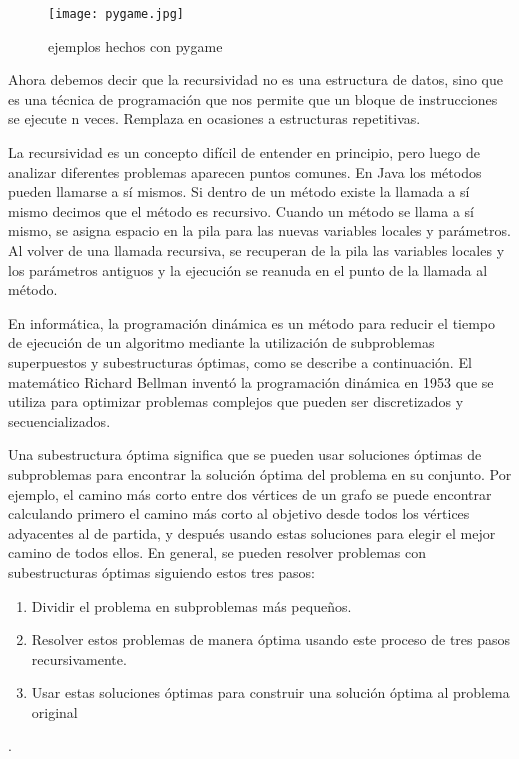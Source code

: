 \documentclass[10pt,twocolumn]{article}
\begin{document}
\begin{figure}[ht]
  \centering
  \texttt{[image: pygame.jpg]}
  \caption{ejemplos hechos con pygame}
\end{figure}

Ahora debemos decir que la recursividad no es una estructura de datos, sino que es una técnica de programación que nos permite que un bloque de instrucciones se ejecute n veces. Remplaza en ocasiones a estructuras repetitivas.

La recursividad es un concepto difícil de entender en principio, pero luego de analizar diferentes problemas aparecen puntos comunes.
En Java los métodos pueden llamarse a sí mismos. Si dentro de un método existe la llamada a sí mismo decimos que el método es recursivo.
Cuando un método se llama a sí mismo, se asigna espacio en la pila para las nuevas variables locales y parámetros.
Al volver de una llamada recursiva, se recuperan de la pila las variables locales y los parámetros antiguos y la ejecución se reanuda en el punto de la llamada al método.

En informática, la programación dinámica es un método para reducir el tiempo de ejecución de un algoritmo mediante la utilización de subproblemas superpuestos y subestructuras óptimas, como se describe a continuación. El matemático Richard Bellman inventó la programación dinámica en 1953 que se utiliza para optimizar problemas complejos que pueden ser discretizados y secuencializados.

Una subestructura óptima significa que se pueden usar soluciones óptimas de subproblemas para encontrar la solución óptima del problema en su conjunto. Por ejemplo, el camino más corto entre dos vértices de un grafo se puede encontrar calculando primero el camino más corto al objetivo desde todos los vértices adyacentes al de partida, y después usando estas soluciones para elegir el mejor camino de todos ellos. En general, se pueden resolver problemas con subestructuras óptimas siguiendo estos tres pasos:

\begin{enumerate}
     \item Dividir el problema en subproblemas más pequeños.
    \item Resolver estos problemas de manera óptima usando este proceso de tres pasos recursivamente.
    \item Usar estas soluciones óptimas para construir una solución óptima al problema original
\end{enumerate}
.
\end{document}
